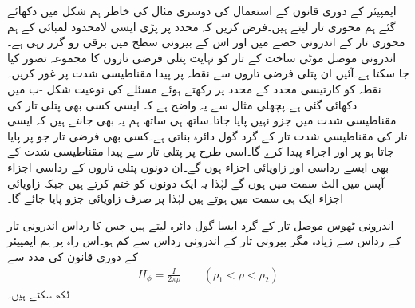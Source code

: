 ایمپیئر کے دوری قانون  کے استعمال کی دوسری مثال کی خاطر ہم شکل  میں دکھائے گئے ہم محوری تار لیتے ہیں۔فرض کریں کہ  محدد پر پڑی  ایسی لامحدود لمبائی کے ہم محوری  تار کے اندرونی حصے میں  اور اس کے بیرونی سطح میں  برقی رو گزر رہی ہے۔اندرونی موصل موٹی ساخت کے تار کو نہایت پتلی فرضی تاروں کا مجموعہ تصور کیا جا سکتا ہے۔آئیں ان پتلی فرضی تاروں سے نقطہ  پر پیدا مقناطیسی شدت پر غور کریں۔نقطہ  کو کارتیسی محدد کے  محدد پر رکھتے ہوئے مسئلے کی نوعیت شکل -ب میں دکھائی گئی ہے۔پچھلی مثال سے یہ واضح ہے کہ ایسی کسی بھی پتلی تار کی مقناطیسی شدت میں  جزو نہیں پایا جاتا۔ساتھ ہی ساتھ ہم یہ بھی جانتے ہیں کہ ایسی تار کی مقناطیسی شدت تار کے گرد گول دائرہ بناتی ہے۔کسی بھی فرضی تار جو  پر پایا جاتا ہو  پر   اور  اجزاء پیدا کرے گا۔اسی طرح  پر پتلی تار سے پیدا مقناطیسی شدت کے بھی ایسے رداسی اور زاویائی اجزاء ہوں گے۔ان دونوں پتلی تاروں کے رداسی اجزاء آپس میں الٹ سمت میں ہوں گے لہٰذا یہ ایک دونوں کو ختم کرتے ہیں جبکہ زاویائی اجزاء ایک ہی سمت میں ہوتے ہیں لہٰذا  پر صرف زاویائی جزو پایا جائے گا۔

اندرونی ٹھوس موصل تار کے گرد ایسا گول دائرہ لیتے ہیں جس کا رداس  اندرونی تار کے رداس  سے زیادہ مگر بیرونی تار کے اندرونی رداس  سے کم ہو۔اس راہ پر ہم ایمپیئر کے دوری قانون کی مدد سے
\begin{align*}
H_{\phi}=\frac{I}{2\pi \rho} \quad \quad (\rho_1 < \rho <\rho_2)
\end{align*}
لکھ سکتے ہیں۔

